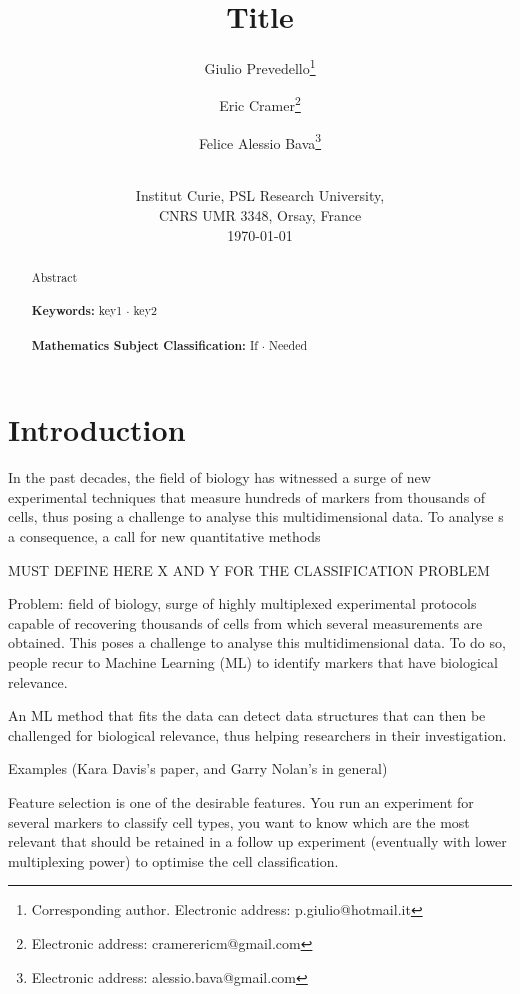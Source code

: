 \documentclass[12pt,a4paper]{article}
\theoremstyle{definition}
\theoremstyle{plain}
\theoremstyle{remark}
\begin{document}
\title{\textbf{Title}}

\author{Giulio Prevedello\footnote{
		Corresponding author. Electronic address: p.giulio@hotmail.it}
	\and
	Eric Cramer\footnote{
		Electronic address: cramerericm@gmail.com}
	\and
	Felice Alessio Bava\footnote{
		Electronic address: alessio.bava@gmail.com}\\ \\
}
\date{
	Institut Curie, PSL Research University,\\ CNRS UMR 3348, Orsay, France\\
	\medskip
	\today
}

\maketitle

\begin{abstract}
	Abstract\\
	\\
	\textbf{Keywords:} key1 $\cdot$ key2 \\
	\\
	\textbf{Mathematics Subject Classification:} If $\cdot$ Needed
	\end{abstract}

\section{Introduction}\label{sec:intro}
In the past decades, the field of biology has witnessed a surge of new experimental techniques that measure hundreds of markers from thousands of cells, thus posing a challenge to analyse this multidimensional data. To analyse s a consequence, a call for new quantitative methods 

MUST DEFINE HERE X AND Y FOR THE CLASSIFICATION PROBLEM

Problem: field of biology, surge of highly multiplexed experimental protocols capable of recovering thousands of cells from which several measurements are obtained. This poses a challenge to analyse this multidimensional data. To do so, people recur to Machine Learning (ML) to identify markers that have biological relevance.

An ML method that fits the data can detect data structures that can then be challenged for biological relevance, thus helping researchers in their investigation.

Examples (Kara Davis's paper, and Garry Nolan's in general)

Feature selection is one of the desirable features. You run an experiment for several markers to classify cell types, you want to know which are the most relevant that should be retained in a follow up experiment (eventually with lower multiplexing power) to optimise the cell classification.
\end{document}
